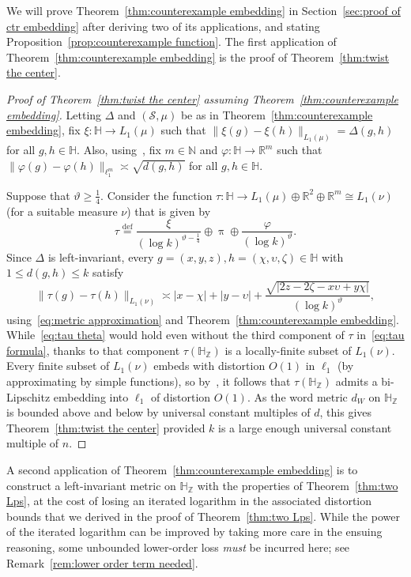 \documentclass[11pt,reqno]{amsart}
\renewcommand{\H}{\mathbb{H}}
\newcommand{\N}{\mathbb{N}}
\newcommand{\R}{\mathbb{R}}
\newcommand{\Z}{\mathbb{Z}}
\newcommand{\0}{\mathbf{0}}
\renewcommand{\1}{\mathbf 1}
\newcommand{\from}{\colon}
\newcommand{\eqdef}{\stackrel{\mathrm{def}}{=}}
\renewcommand{\ge}{\geqslant}
\renewcommand{\le}{\leqslant}
\theoremstyle{remark}
\begin{document}
We will prove Theorem~\ref{thm:counterexample embedding} in Section~\ref{sec:proof of ctr embedding} after deriving  two of its applications, and stating Proposition~\ref{prop:counterexample function}.  The first application of Theorem~\ref{thm:counterexample embedding} is the proof of Theorem~\ref{thm:twist the center}.

\begin{proof}[Proof of Theorem~\ref{thm:twist the center} assuming Theorem~\ref{thm:counterexample embedding}] Letting $\Delta$ and $(\mathscr{S},\mu)$  be as in Theorem~\ref{thm:counterexample embedding}, fix $\xi\from \H\to L_1(\mu)$ such that $\|\xi(g)-\xi(h)\|_{L_1(\mu)}=\Delta(g,h)$ for all $g,h\in \H$. Also, using~\cite{Ass83}, fix $m\in \N$ and $\varphi\from \H\to \R^m$ such that $\|\varphi(g)-\varphi(h)\|_{\ell_1^m}\asymp \sqrt{d(g,h)}$ for all $g,h\in \H$.

Suppose that $\vartheta\ge \frac14$. Consider the function $\tau\from \H\to L_1(\mu)\oplus \R^2\oplus \R^m\cong L_1(\nu)$ (for a suitable measure $\nu$) that is given by
\begin{equation}\label{eq:tau formula}
\tau\eqdef \frac{\xi}{(\log k)^{\vartheta-\frac14}}\oplus \uppi\oplus \frac{\varphi}{(\log k)^\vartheta}.
\end{equation}
Since $\Delta$ is left-invariant, every $g=(x,y,z),h=(\chi,\upsilon,\zeta)\in \H$ with $1\le d(g,h)\le k$ satisfy
\begin{equation}\label{eq:tau theta}
\|\tau(g)-\tau(h)\|_{L_1(\nu)}\asymp |x-\chi|+|y-\upsilon|+\frac{\sqrt{|2z-2\zeta-x\upsilon+y\chi|}}{(\log k)^\vartheta},
\end{equation}
using~\eqref{eq:metric approximation}  and Theorem~\ref{thm:counterexample embedding}. While~\eqref{eq:tau theta} would hold even without the third component of $\tau$ in~\eqref{eq:tau formula}, thanks to that component $\tau(\H_\Z)$ is a locally-finite subset of $L_1(\nu)$. Every finite subset of $L_1(\nu)$ embeds with distortion $O(1)$ in $\ell_1$ (by approximating by simple functions), so by~\cite{Ost12}, it follows that $\tau(\H_\Z)$ admits a bi-Lipschitz embedding into $\ell_1$ of distortion  $O(1)$. As the word metric $d_W$ on $\H_\Z$ is bounded above and below by universal constant multiples of $d$, this gives Theorem~\ref{thm:twist the center} provided $k$ is a large enough universal constant multiple of $n$.
\end{proof}

A second application of Theorem~\ref{thm:counterexample embedding} is to construct a left-invariant metric on $\H_\Z$ with the properties of Theorem~\ref{thm:two Lps}, at the cost of losing an iterated logarithm in the associated distortion bounds that we derived in the proof of Theorem~\ref{thm:two Lps}. While the power of the iterated logarithm can be improved by taking more care in the ensuing reasoning, some  unbounded lower-order  loss {\em must} be incurred here; see Remark~\ref{rem:lower order term needed}.
\end{document}

